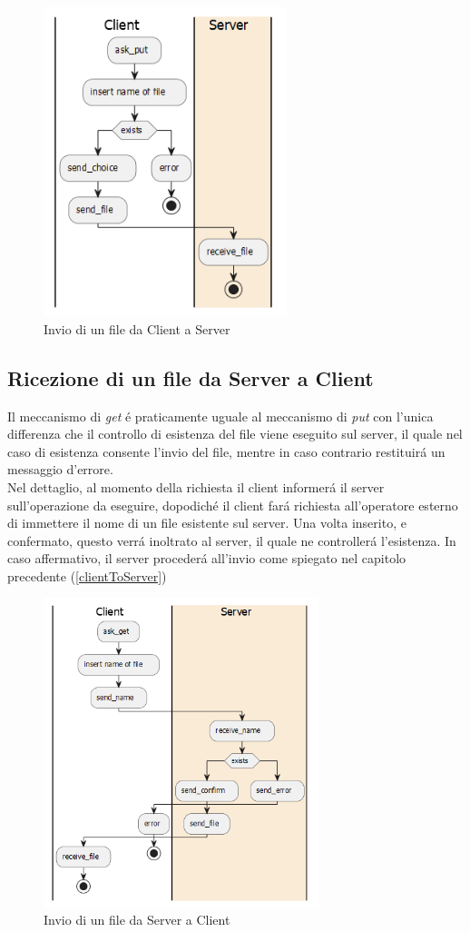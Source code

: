 \documentclass[a4paper, 12pt]{report}
\begin{document}
\begin{figure}[H]
    \centering
    \includegraphics[height=9cm]{img/clientToServer.png}
    \caption{Invio di un file da Client a Server}
\end{figure}

\newpage
\subsection{Ricezione di un file da Server a Client}
Il meccanismo di \emph{get} é praticamente uguale al meccanismo di \emph{put} con l'unica differenza
che il controllo di esistenza del file viene eseguito sul server, il quale nel caso di esistenza
consente l'invio del file, mentre in caso contrario restituirá un messaggio d'errore. 
\\
Nel dettaglio, al momento della richiesta il client informerá il server sull'operazione da eseguire,
dopodiché il client fará richiesta all'operatore esterno di immettere il nome di un file esistente sul server. 
Una volta inserito, e confermato, questo verrá inoltrato al server, il quale ne controllerá l'esistenza.
In caso affermativo, il server procederá all'invio come spiegato nel capitolo precedente (\ref{clientToServer})


\begin{figure}[H]
    \centering
    \includegraphics[height=9cm]{img/serverToClient.png}
    \caption{Invio di un file da Server a Client}
\end{figure}
\end{document}
